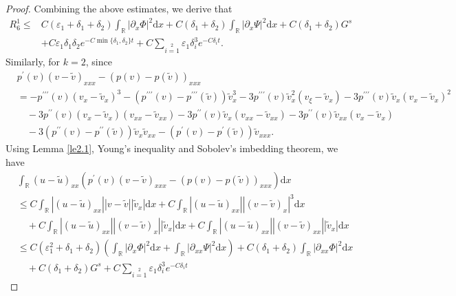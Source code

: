\documentclass[10pt,a4paper]{amsart}
\newcommand{\dif}{\mathrm{d}}
\begin{document}
\begin{proof}
Combining the above estimates, we derive that
\begin{align*}
R_6^1\le &C(\varepsilon_1+\delta_1+\delta_2)\int_\mathbb{R}|\partial_{x}\Phi|^2\dif x
  +C(\delta_1+\delta_2)\int_\mathbb{R}|\partial_{x}\Psi|^2\dif x
  +C(\delta_1+\delta_2)G^s\\
  &+C\varepsilon_1\delta_1\delta_2e^{-C\min\{\delta_1,\delta_2\}t}+C\sum\limits_{i=1}\limits^2\varepsilon_1 \delta_i^3e^{-C\delta_i t}.
\end{align*}
Similarly, for $k=2$, since
\begin{align*}
  &p^{\prime}(v)(v-\widetilde{v})_{xxx}-(p(v)-p(\widetilde{v}))_{xxx}\\
   &=-p^{\prime\prime\prime}(v)(v_{x}-\widetilde{v}_{x})^3
   -(p^{\prime\prime\prime}(v)-p^{\prime\prime\prime}(\widetilde{v}))\widetilde{v}_{x}^3
   -3p^{\prime\prime\prime}(v)\widetilde{v}_{x}^2(v_{\xi}-\widetilde{v}_{x})
   -3p^{\prime\prime\prime}(v)\widetilde{v}_{x}(v_{x}-\widetilde{v}_{x})^2\\
   &\quad-3p^{\prime\prime}(v)(v_{x}-\widetilde{v}_{x})(v_{xx}
   -\widetilde{v}_{xx})-3p^{\prime\prime}(v)\widetilde{v}_{x}(v_{xx}-\widetilde{v}_{xx})
  -3p^{\prime\prime}(v)\widetilde{v}_{xx}(v_{x}-\widetilde{v}_{x})\\
   &\quad-3(p^{\prime\prime}(v)-p^{\prime\prime}(\widetilde{v}))\widetilde{v}_{x}\widetilde{v}_{xx}
   -(p^{\prime}(v)-p^{\prime}(\widetilde{v}))\widetilde{v}_{xxx}.
\end{align*}
Using Lemma \ref{le2.1}, Young's inequality and Sobolev's imbedding theorem, we have
\begin{align*}
 &\int_\mathbb{R}(u-\widetilde{u})_{xx}
     (p^{\prime}(v)(v-\widetilde{v})_{xxx}-(p(v)-p(\widetilde{v}))_{xxx})\dif x\\
      &\leq C\int_\mathbb{R}|(u-\widetilde{u})_{xx}||v-\widetilde{v}||\widetilde{v}_x|\dif x
      +C\int_\mathbb{R}|(u-\widetilde{u})_{xx}||(v-\widetilde{v})_{x}|^3\dif x\\
     &\quad +C\int_\mathbb{R}|(u-\widetilde{u})_{xx}||(v-\widetilde{v})_x||\widetilde{v}_x|\dif x
      +C\int_\mathbb{R}|(u-\widetilde{u})_{xx}||(v-\widetilde{v})_{xx}||\widetilde{v}_x|\dif x\\
& \le C(\varepsilon_1^2+\delta_1+\delta_2)\left(\int_\mathbb{R}|\partial_{x}\Phi|^2\dif x
+\int_\mathbb{R}|\partial_{xx}\Psi|^2\dif x\right)
  +C(\delta_1+\delta_2)\int_\mathbb{R}|\partial_{xx}\Phi|^2\dif x\\
 &\quad +C(\delta_1+\delta_2)G^s+C\sum\limits_{i=1}\limits^2\varepsilon_1 \delta_i^3e^{-C\delta_i t}

\end{align*}
\end{proof}
\end{document}
